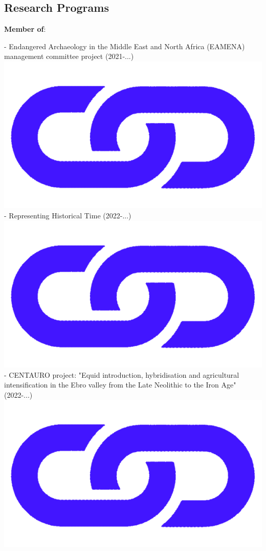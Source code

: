 \documentclass{article}
\begin{document}
\subsection*{Research Programs}

\textbf{Member of}:

- Endangered Archaeology in the Middle East and North Africa (EAMENA) management committee project (2021-...) \href{https://eamena.org/}{\includegraphics[scale=0.02]{link_darkblue.png}}\\
- Representing Historical Time (2022-...) \href{https://github.com/historical-time}{\includegraphics[scale=0.02]{link_darkblue.png}}\\
- CENTAURO project: "Equid introduction, hybridisation and agricultural intensification in the Ebro valley from the Late Neolithic to the Iron Age" (2022-...) \href{https://www.centaur-o.com/}{\includegraphics[scale=0.02]{link_darkblue.png}}\\
\end{document}
